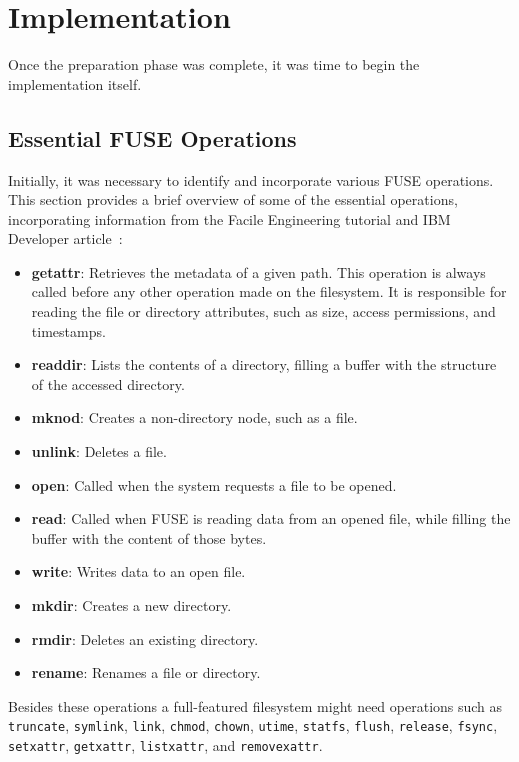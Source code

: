 \chapter{Implementation}
\label{chap:implementation}

Once the preparation phase was complete, it was time to begin the implementation itself.


\section{Essential FUSE Operations}\label{sec:fuse-ops}

Initially, it was necessary to identify and incorporate various FUSE operations.
This section provides a brief overview of some of the essential operations, incorporating information from the Facile Engineering tutorial and IBM Developer article~\cite{ibm_fuse, facile_fuse}:

\begin{itemize}
    \item \textbf{getattr}: Retrieves the metadata of a given path.
    This operation is always called before any other operation made on the filesystem.
    It is responsible for reading the file or directory attributes, such as size, access permissions, and timestamps.
    \item \textbf{readdir}: Lists the contents of a directory, filling a buffer with the structure of the accessed directory.
    \item \textbf{mknod}: Creates a non-directory node, such as a file.
    \item \textbf{unlink}: Deletes a file.
    \item \textbf{open}: Called when the system requests a file to be opened.
    \item \textbf{read}: Called when FUSE is reading data from an opened file, while filling the buffer with the content of those bytes.
    \item \textbf{write}: Writes data to an open file.
    \item \textbf{mkdir}: Creates a new directory.
    \item \textbf{rmdir}: Deletes an existing directory.
    \item \textbf{rename}: Renames a file or directory.
\end{itemize}

Besides these operations a full-featured filesystem might need operations such as \texttt{truncate}, \texttt{symlink}, \texttt{link}, \texttt{chmod}, \texttt{chown}, \texttt{utime}, \texttt{statfs}, \texttt{flush}, \texttt{release}, \texttt{fsync}, \texttt{setxattr}, \texttt{getxattr}, \texttt{listxattr}, and \texttt{removexattr}.


